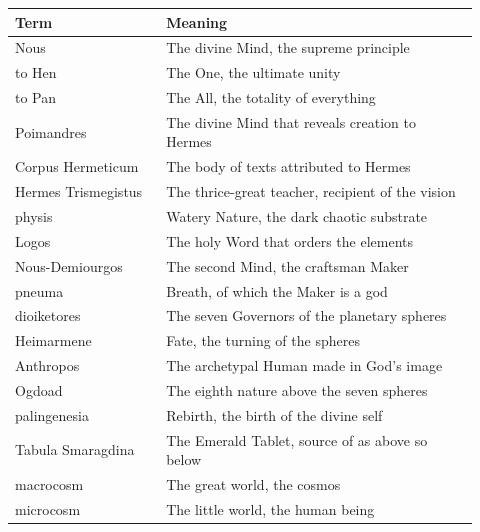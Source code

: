 \begin{longtable}{L{0.30\linewidth} L{0.62\linewidth}}
\toprule
\textbf{Term} & \textbf{Meaning} \\
\midrule
\endhead
Nous & The divine Mind, the supreme principle \\
to Hen & The One, the ultimate unity \\
to Pan & The All, the totality of everything \\
Poimandres & The divine Mind that reveals creation to Hermes \\
Corpus Hermeticum & The body of texts attributed to Hermes \\
Hermes Trismegistus & The thrice-great teacher, recipient of the vision \\
physis & Watery Nature, the dark chaotic substrate \\
Logos & The holy Word that orders the elements \\
Nous-Demiourgos & The second Mind, the craftsman Maker \\
pneuma & Breath, of which the Maker is a god \\
dioiketores & The seven Governors of the planetary spheres \\
Heimarmene & Fate, the turning of the spheres \\
Anthropos & The archetypal Human made in God's image \\
Ogdoad & The eighth nature above the seven spheres \\
palingenesia & Rebirth, the birth of the divine self \\
Tabula Smaragdina & The Emerald Tablet, source of as above so below \\
macrocosm & The great world, the cosmos \\
microcosm & The little world, the human being \\
\bottomrule
\end{longtable}
